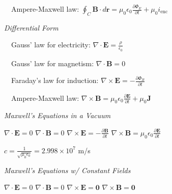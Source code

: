 \documentclass[twocolumn]{article}
\begin{document}
$\quad$Ampere-Maxwell law: $\oint_C \mathbf{B} \cdot d\mathbf{r} = \mu_0 \epsilon_0 \frac{\partial \Phi_E}{\partial t} + \mu_0 i_{\text{enc}}$

\textit{Differential Form}

$\quad$Gauss' law for electricity: $\nabla \cdot \mathbf{E} = \frac{\rho}{\epsilon_0}$

$\quad$Gauss' law for magnetism: $\nabla \cdot \mathbf{B} = 0$

$\quad$Faraday's law for induction: $\nabla \times \mathbf{E} = -\frac{\partial \Phi_B}{\partial t}$

$\quad$Ampere-Maxwell law: $\nabla \times \mathbf{B} = \mu_0 \epsilon_0 \frac{\partial \mathbf{E}}{\partial t} + \mu_0 \mathbf{J}$

\textit{Maxwell's Equations in a Vacuum}

$\nabla \cdot \mathbf{E} = 0$ \hfill $\nabla \cdot \mathbf{B} = 0$ \hfill $\nabla \times \mathbf{E} = -\frac{\partial \mathbf{B}}{\partial t}$ \hfill $\nabla \times \mathbf{B} = \mu_0 \epsilon_0 \frac{\partial \mathbf{E}}{\partial t}$

$c = \frac{1}{\sqrt{\mu_0 \epsilon_0}} = 2.998 \times 10^7$ m/s

\textit{Maxwell's Equations w/ Constant Fields}

$\nabla \cdot \mathbf{E} = 0$ \hfill $\nabla \cdot \mathbf{B} = 0$ \hfill $\nabla \times \mathbf{E} = \mathbf{0}$ \hfill $\nabla \times \mathbf{B} = \mathbf{0}$
\end{document}
